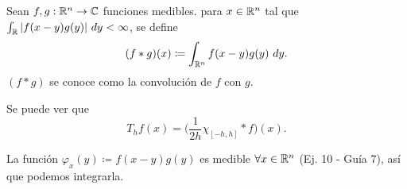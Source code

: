 \begin{definition}[convolución]
	Sean $f,g : \mathbb{R}^{n} \to \mathbb{C}$ funciones medibles. para $x \in \mathbb{R}^{n}$ tal que $\int_{\mathbb{R}} | f(x - y) g(y) | \ dy < \infty$, se define
	\[ (f * g)(x) \coloneq \int_{\mathbb{R}^{n}} f(x - y) g(y) \ dy. \]
	$(f * g)$ se conoce como la convolución de $f$ con $g$.
\end{definition}

\begin{eg}
	Se puede ver que
	\[ T_{h}f(x) = \Big( \frac{1}{2h} \chi_{[-h,h]} * f \Big)(x). \]
\end{eg}

\begin{remark}
	La función $\varphi_{x}(y) \coloneq f(x - y) g(y)$ es medible $\forall x \in \mathbb{R}^{n}$ (Ej. 10 - Guía 7), así que podemos integrarla.
\end{remark}

